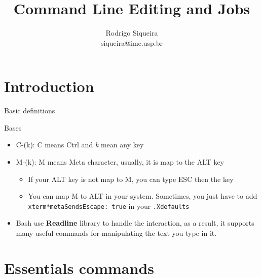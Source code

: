 \documentclass[10pt, compress, aspectratio=169]{beamer}
\title{Command Line Editing and Jobs}
\author{\footnotesize Rodrigo Siqueira \\ {\scriptsize siqueira@ime.usp.br}}
\begin{document}
\maketitle

\section{Introduction}
\begin{frame}{Basic definitions}
  \begin{exampleblock}{Bases}
    \begin{itemize}
      \item C-(k): C means Ctrl and \textit{k} mean any key
      \item M-(k): M means Meta character, usually, it is map to the ALT key
        \begin{itemize}
          \item If your ALT key is not map to M, you can type ESC then the key
          \item You can map M to ALT in your system. Sometimes, you just have
                to add \texttt{xterm*metaSendsEscape: true} in your
                \texttt{.Xdefaults}
        \end{itemize}
      \item Bash use \textbf{Readline} library to handle the interaction, as a
            result, it supports many useful commands for manipulating the text
            you type in it.
    \end{itemize}
  \end{exampleblock}
\end{frame}

\section{Essentials commands}
\end{document}
